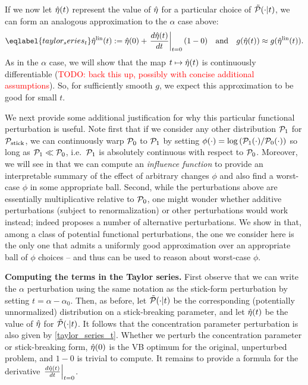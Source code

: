 If we now let $\hat\eta(t)$ represent the value of $\hat\eta$ for a particular choice of $\tilde{\mathcal{P}}(\cdot \vert t)$, we can form an analogous approximation to the $\alpha$ case above:
%
\begin{align} \eqlabel{taylor_series_t}
%
\etalin(\t) :=
    \etaopt(0) +
    \fracat{d\etaopt(t)}{dt}{\t=0} (1 - 0)
\mathand
g(\etaopt(\t)) \approx g(\etalin(\t)).
%
\end{align}
%
As in the $\alpha$ case, we will show that the map $t \mapsto \hat\eta(t)$ is continuously differentiable (\textcolor{red}{TODO: back this up, possibly with concise additional assumptions}). So, for sufficiently smooth $g$, we expect this approximation to be good for small $t$.

We next provide some additional justification for why this particular functional perturbation is useful. Note first that if we consider any other distribution $\mathcal{P}_{1}$ for $\mathcal{P}_{\mathrm{stick}}$, we can continuously warp $\mathcal{P}_{0}$ to $\mathcal{P}_{1}$ by setting $\phi(\cdot) = \log \left( \mathcal{P}_{1}(\cdot) / \mathcal{P}_{0}(\cdot) \right)$ so long as $\mathcal{P}_{1} \ll \mathcal{P}_{0}$, i.e.\ $\mathcal{P}_{1}$ is absolutely continuous with respect to $\mathcal{P}_{0}$. Moreover, we will see in  that we can compute an \emph{influence function} to provide an interpretable summary of the effect of arbitrary changes $\phi$ and also find a worst-case $\phi$ in some appropriate ball. Second, while the perturbations above are essentially multiplicative relative to $\mathcal{P}_{0}$, one might wonder whether additive perturbations (subject to renormalization) or other perturbations would work instead; indeed \citet{gustafson:1996:local} proposes a number of alternative perturbations. We show in  that, among a class of potential functional perturbations, the one we consider here is the only one that admits a uniformly good approximation over an appropriate ball of $\phi$ choices -- and thus can be used to reason about worst-case $\phi$.

\noindent \textbf{Computing the terms in the Taylor series.}
First observe that we can write the $\alpha$ perturbation using the same notation as the stick-form perturbation by setting $t = \alpha - \alpha_0$. Then, as before, let $\tilde{\mathcal{P}}(\cdot \vert t)$ be the corresponding (potentially unnormalized) distribution on a stick-breaking parameter, and let $\hat\eta(t)$ be the value of $\hat\eta$ for $\tilde{\mathcal{P}}(\cdot \vert t)$. It follows that the concentration parameter perturbation is also given by \eqref{taylor_series_t}. Whether we perturb the concentration parameter or stick-breaking form, $\hat\eta(0)$ is the VB optimum for the original, unperturbed problem, and $1-0$ is trivial to compute. It remains to provide a formula for the derivative $\left.\frac{d\hat\eta(t)}{dt}\right\vert_{t=0}$.

